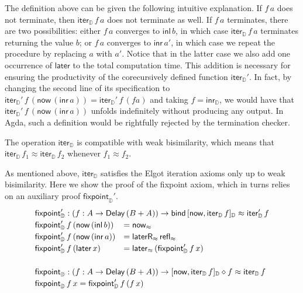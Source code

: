 \documentclass[runningheads,a4paper]{llncs}
\newcommand{\inl}{\mathsf{inl}}
\newcommand{\inr}{\mathsf{inr}}
\newcommand{\Delay}{\ensuremath{\mathsf{Delay}\,}}
\newcommand{\now}{\mathsf{now}}
\newcommand{\later}{\mathsf{later}}
\newcommand{\laterR}{\mathsf{laterR}}
\newcommand{\bind}{\mathsf{bind}}
\newcommand{\D}{\mathbb{D}}
\newcommand{\copairD}[2]{[#1,#2]_{\D}}
\newcommand{\inrD}{\mathsf{inr}_{\D}}
\newcommand{\iterD}{\mathsf{iter}_\D}
\newcommand{\unfolding}{\mathsf{fixpoint}_\D}
\newcommand{\refl}{\mathsf{refl}}
\begin{document}
The definition above can be given the following intuitive
explanation. If $f\,a$ does not terminate, then $\iterD\,f\,a$ does
not terminate as well. If $f\,a$ terminates, there are two
possibilities: either $f\,a$ converges to $\inl\,b$, in which case
$\iterD\,f\,a$ terminates returning the value $b$; or $f\,a$ converges
to $\inr\,a'$, in which case we repeat the procedure by replacing $a$
with $a'$. Notice that in the latter case we also add one occurrence
of $\later$ to the total computation time. This addition is necessary
for ensuring the productivity of the corecursively defined function
$\iterD'$. In fact, by changing the second line of its specification to
$\iterD' \,f \,(\now \,(\inr\, a)) = \iterD' \,f \,(f a)$
and taking $f = \inrD$, we would have that $\iterD' \,f \,(\now
\,(\inr\, a))$ unfolds indefinitely without producing any output. In
Agda, such a definition would be rightfully rejected by the termination
checker. 

The operation $\iterD$ is compatible with weak bisimilarity, which means
that $\iterD\,f_1 \approx \iterD\,f_2$ whenever $f_1 \approx f_2$.

As mentioned above, $\iterD$ satisfies the Elgot iteration axioms only
up to weak bisimilarity. Here we show the proof of the fixpoint
axiom, which in turns relies on an auxiliary proof $\unfolding'$. 
\[
\def\arraystretch{1.2}
\begin{array}{ll}
\multicolumn{2}{l}{\unfolding' : (f : A \to \Delay (B + A)) \to
  \bind\, \copairD {\now}{\iterD \,f} \approx \iterD' \,f} \\
\unfolding' \,f \,(\now \,(\inl \,b)) & = \now_\approx \\
\unfolding' \,f \,(\now \,(\inr \,a)) & = \laterR_{\approx} \,
  \refl_\approx \\
\unfolding' \,f \,(\later \,x) & = \later_\approx \,(\unfolding'\, f\,
  x) \\
 \\
\multicolumn{2}{l}{\unfolding : (f : A \to \Delay (B + A)) \to
  \copairD {\now}{\iterD \,f}\diamond f \approx \iterD \,f}\\
\multicolumn{2}{l}{\unfolding \,f\,x = \unfolding'\,f\,(f\,x)}
\end{array}
\]
\end{document}
